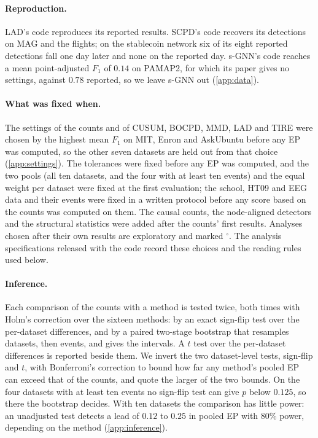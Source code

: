 \documentclass[11pt]{article}
\theoremstyle{dsplain}
\theoremstyle{definition}
\begin{document}
\paragraph{Reproduction.} LAD's code reproduces its reported results. SCPD's code recovers its detections on
MAG and the flights; on the stablecoin network six of its eight reported detections fall one day later and
none on the reported day. s-GNN's code reaches a mean point-adjusted $F_1$ of $0.14$ on PAMAP2, for which its paper gives no
settings, against $0.78$ reported, so we
leave s-GNN out (\cref{app:data}).

\paragraph{What was fixed when.} The settings of the counts and of CUSUM, BOCPD, MMD, LAD and TIRE were
chosen by the highest mean $F_1$ on MIT, Enron and AskUbuntu before any EP was computed, so the other
seven datasets are held out from that choice (\cref{app:settings}). The tolerances were fixed before any EP was
computed, and the two pools (all ten datasets, and the four with at least ten events) and the equal weight
per dataset were fixed at the first evaluation; the school, HT09 and EEG data and their events were fixed in a written protocol before any score
based on the counts was computed on them. The causal counts, the node-aligned detectors and the structural
statistics were added after the counts' first results. Analyses chosen after their own results are
exploratory and marked $^\circ$. The analysis specifications released with the code record these choices
and the reading rules used below.

\paragraph{Inference.} Each comparison of the counts with a method is tested twice, both times with Holm's
correction \citep{holm1979simple} over the sixteen methods: by an exact sign-flip test over the
per-dataset differences, and by a paired two-stage bootstrap that resamples datasets, then events, and
gives the intervals. A $t$ test over the per-dataset differences is
reported beside them. We invert the two dataset-level tests, sign-flip and $t$, with
Bonferroni's correction to bound how far any method's pooled EP can exceed that of the counts, and quote the
larger of the two bounds. On the four datasets with at least ten events no
sign-flip test can give $p$ below $0.125$, so there the bootstrap decides. With ten datasets the comparison
has little power: an
unadjusted test detects a lead of $0.12$ to $0.25$ in pooled EP with $80\%$ power, depending on the method
(\cref{app:inference}).
\end{document}
